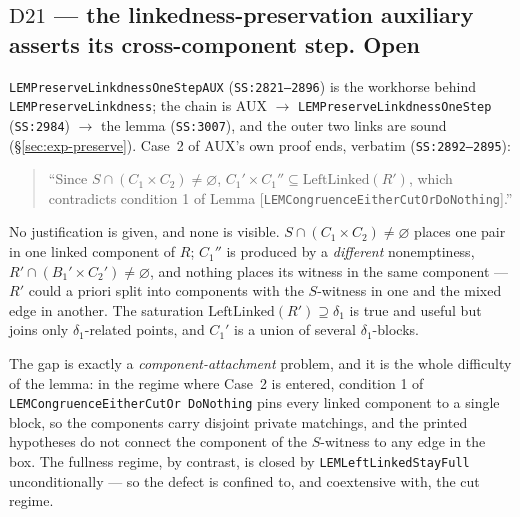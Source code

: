 \subsection{$\mathrm D{21}$ --- the linkedness-preservation auxiliary asserts
  its cross-component step. \textbf{Open}}\label{sec:D21}

\texttt{LEMPreserve\brk Linkdness\brk OneStepAUX} (\texttt{SS:2821--2896})
is the workhorse behind \texttt{LEMPreserve\brk Linkdness}; the chain is AUX
$\to$ \texttt{LEMPreserve\brk Linkdness\brk OneStep} (\texttt{SS:2984})
$\to$ the lemma
(\texttt{SS:3007}), and the outer two links are sound
(\S\ref{sec:exp-preserve}). Case~2 of AUX's own proof ends, verbatim
(\texttt{SS:2892--2895}):

\begin{quote}\small
``Since $S\cap(C_{1}\times C_{2})\neq\varnothing$,
$C_{1}'\times C_{1}''\subseteq \mathrm{LeftLinked}(R')$, which contradicts
condition 1 of Lemma [\texttt{LEMCongruenceEitherCutOrDoNothing}].''
\end{quote}

No justification is given, and none is visible. $S\cap(C_{1}\times
C_{2})\neq\varnothing$ places one pair in one linked component of $R$;
$C_{1}''$ is produced by a \emph{different} nonemptiness,
$R'\cap(B_{1}'\times C_{2}')\neq\varnothing$, and nothing places its
witness in the same component --- $R'$ could a priori split into components
with the $S$-witness in one and the mixed edge in another. The saturation
$\mathrm{LeftLinked}(R')\supseteq\delta_{1}$ is true and useful but joins
only $\delta_{1}$-related points, and $C_{1}'$ is a union of several
$\delta_{1}$-blocks.

The gap is exactly a \emph{component-attachment} problem, and it is the
whole difficulty of the lemma: in the regime where Case~2 is entered,
condition 1 of \texttt{LEMCongruence\brk Either\brk Cut\brk Or\brk
DoNothing} pins every linked
component to a single block, so the components carry disjoint private
matchings, and the printed hypotheses do not connect the component of the
$S$-witness to any edge in the box. The fullness regime, by contrast, is
closed by \texttt{LEMLeftLinkedStayFull} unconditionally --- so the defect
is confined to, and coextensive with, the cut regime.


